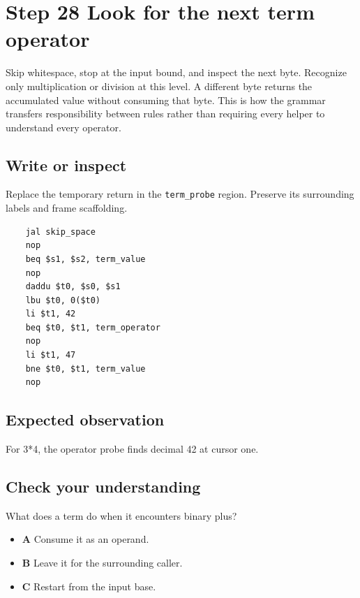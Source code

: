 \section{Step 28 Look for the next term operator}\label{expression-s28}

Skip whitespace, stop at the input bound, and inspect the next byte. Recognize only multiplication or division at this level. A different byte returns the accumulated value without consuming that byte. This is how the grammar transfers responsibility between rules rather than requiring every helper to understand every operator.

\subsection{Write or inspect}
Replace the temporary return in the \texttt{term\_probe} region. Preserve its surrounding labels and frame scaffolding.

\begin{verbatim}
    jal skip_space
    nop
    beq $s1, $s2, term_value
    nop
    daddu $t0, $s0, $s1
    lbu $t0, 0($t0)
    li $t1, 42
    beq $t0, $t1, term_operator
    nop
    li $t1, 47
    bne $t0, $t1, term_value
    nop
\end{verbatim}
\subsection{Expected observation}
For 3*4, the operator probe finds decimal 42 at cursor one.

\subsection{Check your understanding}
What does a term do when it encounters binary plus?

\begin{itemize}
  \item \textbf{A} Consume it as an operand.
  \item \textbf{B} Leave it for the surrounding caller.
  \item \textbf{C} Restart from the input base.
\end{itemize}
